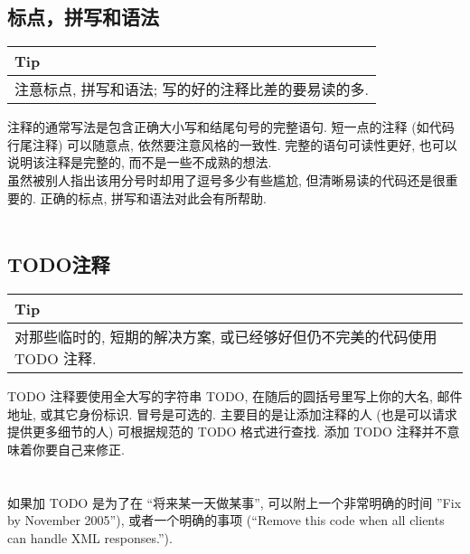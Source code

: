\documentclass[a4paper,11pt,CJK]{article}
\begin{document}
\begin{CJK}{UTF8}{gbsn}
\subsection{标点，拼写和语法}
\begin{table}[htbp]
\flushleft
\begin{tabular}{p{400pt}}
\toprule
\rowcolor[gray]{.8} Tip \\
\midrule
注意标点, 拼写和语法; 写的好的注释比差的要易读的多.\\
\bottomrule
\end{tabular}
\end{table}
注释的通常写法是包含正确大小写和结尾句号的完整语句. 短一点的注释 (如代码行尾注释) 可以随意点, 依然要注意风格的一致性. 完整的语句可读性更好, 也可以说明该注释是完整的, 而不是一些不成熟的想法.\\
虽然被别人指出该用分号时却用了逗号多少有些尴尬, 但清晰易读的代码还是很重要的. 正确的标点, 拼写和语法对此会有所帮助.
\\
\\
\subsection{TODO注释}
\begin{table}[htbp]
\flushleft
\begin{tabular}{p{400pt}}
\toprule
\rowcolor[gray]{.8} Tip \\
\midrule
对那些临时的, 短期的解决方案, 或已经够好但仍不完美的代码使用 TODO 注释.\\
\bottomrule
\end{tabular}
\end{table}
TODO 注释要使用全大写的字符串 TODO, 在随后的圆括号里写上你的大名, 邮件地址, 或其它身份标识. 冒号是可选的. 主要目的是让添加注释的人 (也是可以请求提供更多细节的人) 可根据规范的 TODO 格式进行查找. 添加 TODO 注释并不意味着你要自己来修正.\\
\\
\\
\indent 如果加 TODO 是为了在 ``将来某一天做某事'', 可以附上一个非常明确的时间 ''Fix by November 2005''), 或者一个明确的事项 (``Remove this code when all clients can handle XML responses.'').
\\

\end{CJK}
\end{document}
